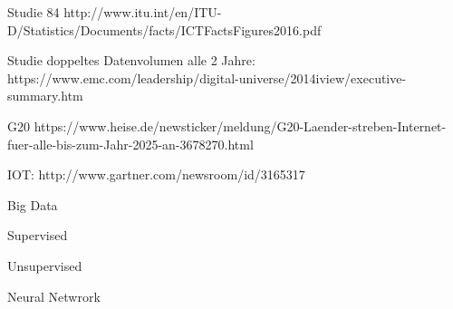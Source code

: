 Studie 84%
http://www.itu.int/en/ITU-D/Statistics/Documents/facts/ICTFactsFigures2016.pdf 

Studie doppeltes Datenvolumen alle 2 Jahre:
https://www.emc.com/leadership/digital-universe/2014iview/executive-summary.htm

G20
https://www.heise.de/newsticker/meldung/G20-Laender-streben-Internet-fuer-alle-bis-zum-Jahr-2025-an-3678270.html

IOT:
http://www.gartner.com/newsroom/id/3165317

Big Data

Supervised 

Unsupervised

Neural Netwrork